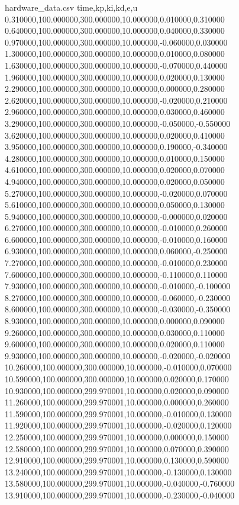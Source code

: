 \begin{filecontents}{hardware_data.csv}
time,kp,ki,kd,e,u
0.310000,100.000000,300.000000,10.000000,0.010000,0.310000
0.640000,100.000000,300.000000,10.000000,0.040000,0.330000
0.970000,100.000000,300.000000,10.000000,-0.060000,0.030000
1.300000,100.000000,300.000000,10.000000,0.010000,0.080000
1.630000,100.000000,300.000000,10.000000,-0.070000,0.440000
1.960000,100.000000,300.000000,10.000000,0.020000,0.130000
2.290000,100.000000,300.000000,10.000000,0.000000,0.280000
2.620000,100.000000,300.000000,10.000000,-0.020000,0.210000
2.960000,100.000000,300.000000,10.000000,0.030000,0.460000
3.290000,100.000000,300.000000,10.000000,-0.050000,-0.550000
3.620000,100.000000,300.000000,10.000000,0.020000,0.410000
3.950000,100.000000,300.000000,10.000000,0.190000,-0.340000
4.280000,100.000000,300.000000,10.000000,0.010000,0.150000
4.610000,100.000000,300.000000,10.000000,0.020000,0.070000
4.940000,100.000000,300.000000,10.000000,0.020000,0.050000
5.270000,100.000000,300.000000,10.000000,-0.020000,0.070000
5.610000,100.000000,300.000000,10.000000,0.050000,0.130000
5.940000,100.000000,300.000000,10.000000,-0.000000,0.020000
6.270000,100.000000,300.000000,10.000000,-0.010000,0.260000
6.600000,100.000000,300.000000,10.000000,-0.010000,0.160000
6.930000,100.000000,300.000000,10.000000,0.060000,-0.250000
7.270000,100.000000,300.000000,10.000000,-0.010000,0.230000
7.600000,100.000000,300.000000,10.000000,-0.110000,0.110000
7.930000,100.000000,300.000000,10.000000,-0.010000,-0.100000
8.270000,100.000000,300.000000,10.000000,-0.060000,-0.230000
8.600000,100.000000,300.000000,10.000000,-0.030000,-0.350000
8.930000,100.000000,300.000000,10.000000,0.000000,0.090000
9.260000,100.000000,300.000000,10.000000,0.030000,0.110000
9.600000,100.000000,300.000000,10.000000,0.020000,0.110000
9.930000,100.000000,300.000000,10.000000,-0.020000,-0.020000
10.260000,100.000000,300.000000,10.000000,-0.010000,0.070000
10.590000,100.000000,300.000000,10.000000,0.020000,0.170000
10.930000,100.000000,299.970001,10.000000,0.020000,0.090000
11.260000,100.000000,299.970001,10.000000,0.000000,0.260000
11.590000,100.000000,299.970001,10.000000,-0.010000,0.130000
11.920000,100.000000,299.970001,10.000000,-0.020000,0.120000
12.250000,100.000000,299.970001,10.000000,0.000000,0.150000
12.580000,100.000000,299.970001,10.000000,0.070000,0.390000
12.910000,100.000000,299.970001,10.000000,0.130000,0.590000
13.240000,100.000000,299.970001,10.000000,-0.130000,0.130000
13.580000,100.000000,299.970001,10.000000,-0.040000,-0.760000
13.910000,100.000000,299.970001,10.000000,-0.230000,-0.040000

\end{filecontents}
